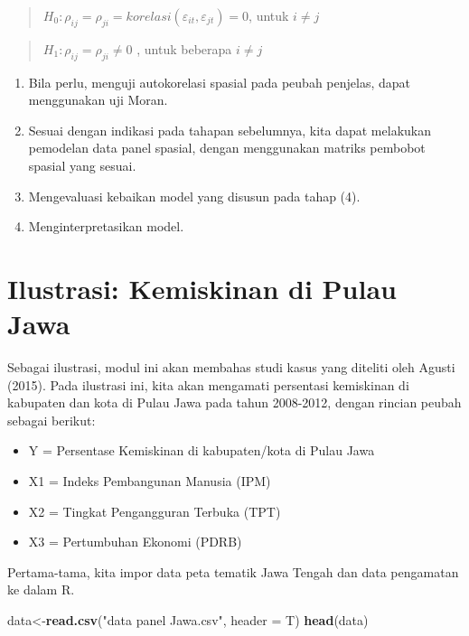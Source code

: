 \documentclass[
]{book}
\newenvironment{Shaded}{\begin{snugshade}}{\end{snugshade}}
\newcommand{\DataTypeTok}[1]{\textcolor[rgb]{0.13,0.29,0.53}{#1}}
\newcommand{\KeywordTok}[1]{\textcolor[rgb]{0.13,0.29,0.53}{\textbf{#1}}}
\newcommand{\NormalTok}[1]{#1}
\newcommand{\StringTok}[1]{\textcolor[rgb]{0.31,0.60,0.02}{#1}}
\begin{document}
\begin{quote}
\(H_0: \rho_{ij}=\rho_{ji}= korelasi(\varepsilon_{it}, \varepsilon_{jt})=0\), untuk \(i \ne j\)
\end{quote}

\begin{quote}
\(H_1: \rho_{ij}=\rho_{ji} \ne 0\) , untuk beberapa \(i \ne j\)
\end{quote}

\begin{enumerate}
\def\labelenumi{(\arabic{enumi})}
\setcounter{enumi}{2}
\item
  Bila perlu, menguji autokorelasi spasial pada peubah penjelas, dapat menggunakan uji Moran.
\item
  Sesuai dengan indikasi pada tahapan sebelumnya, kita dapat melakukan pemodelan data panel spasial, dengan menggunakan matriks pembobot spasial yang sesuai.
\item
  Mengevaluasi kebaikan model yang disusun pada tahap (4).
\item
  Menginterpretasikan model.
\end{enumerate}

\hypertarget{ilustrasi-kemiskinan-di-pulau-jawa}{%
\section{Ilustrasi: Kemiskinan di Pulau Jawa}\label{ilustrasi-kemiskinan-di-pulau-jawa}}

Sebagai ilustrasi, modul ini akan membahas studi kasus yang diteliti oleh Agusti (2015). Pada ilustrasi ini, kita akan mengamati persentasi kemiskinan di kabupaten dan kota di Pulau Jawa pada tahun 2008-2012, dengan rincian peubah sebagai berikut:

\begin{itemize}
\item
  Y = Persentase Kemiskinan di kabupaten/kota di Pulau Jawa
\item
  X1 = Indeks Pembangunan Manusia (IPM)
\item
  X2 = Tingkat Pengangguran Terbuka (TPT)
\item
  X3 = Pertumbuhan Ekonomi (PDRB)
\end{itemize}

Pertama-tama, kita impor data peta tematik Jawa Tengah dan data pengamatan ke dalam R.

\begin{Shaded}
\begin{Highlighting}[]
\NormalTok{data\textless{}{-}}\KeywordTok{read.csv}\NormalTok{(}\StringTok{"data panel Jawa.csv"}\NormalTok{, }\DataTypeTok{header =}\NormalTok{ T)}
\KeywordTok{head}\NormalTok{(data)}
\end{Highlighting}
\end{Shaded}
\end{document}
